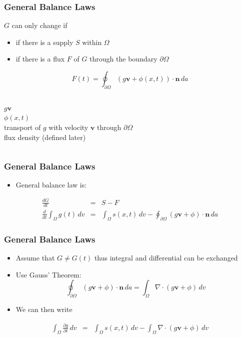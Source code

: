 \documentclass[hide notes,intlimits]{beamer}
\begin{document}
\begin{frame}
  \frametitle{General Balance Laws}
  $G$ can only change if
 \begin{itemize}
   \item if there is a supply $S$ within $\Omega$
   \item if there is a flux $F$ of $G$ through the boundary $\partial \Omega$
  \end{itemize}
  \begin{equation}
   F(t) = \oint_{\partial \Omega} \left(g\mathbf{v} + \phi(x,t)\right) \cdot \mathbf{n}\,da
   \end{equation}
    \begin{columns}
      \column[C]{0.1cm}
      $g\mathbf{v}$ \\
      $\phi(x,t)$ \\
     \column[C]{7cm}
      transport of $g$ with velocity $\mathbf{v}$ through $\partial \Omega$\\
      flux density (defined later) \\
   \end{columns}
\end{frame}


\begin{frame}
  \frametitle{General Balance Laws}
  \begin{itemize}
 \item General balance law is:
  \end{itemize}
  \begin{eqnarray}
    \frac{dG}{dt} &=& S - F \\[1em]
    \frac{d}{dt} \int_{\Omega} g(t)\,dv &=& \int_{\Omega} s(x,t)\,d v - \oint_{\partial \Omega} \left(g\mathbf{v} + \phi\right) \cdot \mathbf{n}\,da
  \end{eqnarray}
\end{frame}

\begin{frame}
  \frametitle{General Balance Laws}
  \begin{itemize}
  \item Assume that $G \ne G(t)$ thus integral and differential can be exchanged
  \item Use Gauss' Theorem:
    \begin{displaymath}
      \oint_{\partial \Omega} \left(g\mathbf{v} + \phi\right) \cdot \mathbf{n}\,da = \int_{\Omega} \nabla \cdot \left(g\mathbf{v} + \phi\right)\,dv
   \end{displaymath}
  \item We can then write
  \end{itemize}
  \begin{eqnarray}
   \int_{\Omega} \frac{\partial g}{\partial t}\,dv &=& \int_{\Omega} s(x,t)\,d v - \int_{\Omega} \nabla \cdot \left(g\mathbf{v} + \phi\right)\,dv
  \end{eqnarray}
\end{frame}
\end{document}
